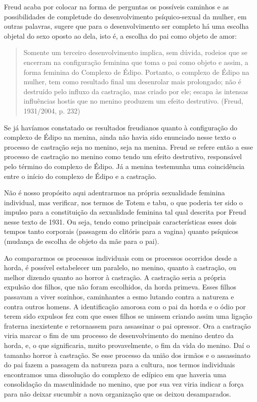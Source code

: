 Freud acaba por colocar na forma de perguntas os possíveis caminhos e as
possibilidades de completude do desenvolvimento psíquico-sexual da
mulher, em outras palavras, sugere que para o desenvolvimento ser
completo há uma escolha objetal do sexo oposto ao dela, isto é, a
escolha do pai como objeto de amor:

\begin{quote}
Somente um terceiro desenvolvimento implica, sem dúvida, rodeios que se
encerram na configuração feminina que toma o pai como objeto e assim, a
forma feminina do Complexo de Édipo. Portanto, o complexo de Édipo na
mulher, tem como resultado final um desenrolar mais prolongado; não é
destruído pelo influxo da castração, mas criado por ele; escapa às
intensas influências hostis que no menino produzem um efeito destrutivo.
(Freud, 1931/2004, p. 232)
\end{quote}

Se já havíamos constatado os resultados freudianos quanto à configuração
do complexo de Édipo na menina, ainda não havia sido enunciado nesse
texto o processo de castração seja no menino, seja na menina. Freud se
refere então a esse processo de castração no menino como tendo um efeito
destrutivo, responsável pelo término do complexo de Édipo. Já a menina
testemunha uma coincidência entre o início do complexo de Édipo e a
castração.

Não é nosso propósito aqui adentrarmos na própria sexualidade feminina
individual, mas verificar, nos termos de Totem e tabu, o que poderia ter
sido o impulso para a constituição da sexualidade feminina tal qual
descrita por Freud nesse texto de 1931. Ou seja, tendo como principais
características esses dois tempos tanto corporais (passagem do clitóris
para a vagina) quanto psíquicos (mudança de escolha de objeto da mãe
para o pai).

Ao compararmos os processos individuais com os processos ocorridos desde
a horda, é possível estabelecer um paralelo, no menino, quanto à
castração, ou melhor dizendo quanto ao horror à castração. A castração
seria a própria expulsão dos filhos, que não foram escolhidos, da horda
primeva. Esses filhos passavam a viver sozinhos, caminhantes a esmo
lutando contra a natureza e contra outros homens. A identificação
amorosa com o pai da horda e o ódio por terem sido expulsos fez com que
esses filhos se unissem criando assim uma ligação fraterna inexistente e
retornassem para assassinar o pai opressor. Ora a castração viria marcar
o fim de um processo de desenvolvimento do menino dentro da horda, e, o
que significaria, muito provavelmente, o fim da vida do menino. Daí o
tamanho horror à castração. Se esse processo da união dos irmãos e o
assassinato do pai fazem a passagem da natureza para a cultura, nos
termos individuais encontramos uma dissolução do complexo de edípico em
que haveria uma consolidação da masculinidade no menino, que por sua vez
viria indicar a força para não deixar sucumbir a nova organização que os
deixou desamparados.

